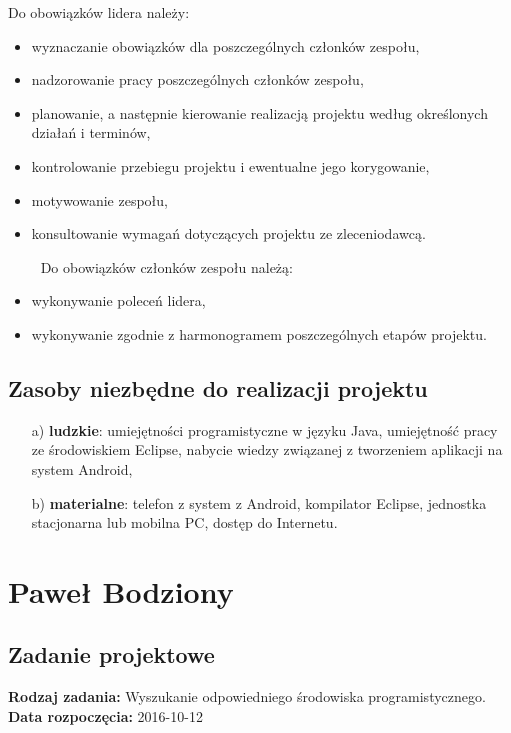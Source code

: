 Do obowiązków lidera należy:
\begin{itemize} \itemsep1pt \parskip0pt 
\item wyznaczanie obowiązków dla poszczególnych członków zespołu,
\item nadzorowanie pracy poszczególnych członków zespołu,
\item planowanie, a następnie kierowanie realizacją projektu według określonych działań i terminów, 
\item kontrolowanie przebiegu projektu i ewentualne jego korygowanie,
\item motywowanie zespołu,
\item konsultowanie wymagań dotyczących projektu ze zleceniodawcą.
\end{itemize}
$\qquad$ Do obowiązków członków zespołu należą:
\begin{itemize}\itemsep1pt \parskip0pt 
\item wykonywanie poleceń lidera,
\item wykonywanie zgodnie z harmonogramem poszczególnych etapów projektu.
\end{itemize}
\section{Zasoby niezbędne do realizacji projektu}
\begin{itemize}
\item [a)] \textbf{ludzkie}: umiejętności programistyczne w języku Java, umiejętność pracy ze środowiskiem Eclipse, nabycie wiedzy związanej z tworzeniem aplikacji na system Android,
\item [b)] \textbf{materialne}: telefon z system z Android, kompilator Eclipse, jednostka stacjonarna lub mobilna PC, dostęp do Internetu.
\end{itemize}



\chapter {Paweł Bodziony}
\section{Zadanie projektowe}
\noindent\textbf{Rodzaj zadania:} Wyszukanie odpowiedniego środowiska programistycznego. \\

\noindent\textbf{Data rozpoczęcia:} 2016-10-12\\

